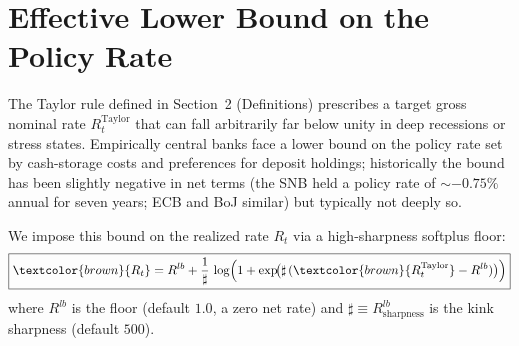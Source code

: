 %
%
%
%

\section{Effective Lower Bound on the Policy Rate}
\label{sec:elb}

The Taylor rule defined in Section~2 (Definitions) prescribes a target
gross nominal rate $R^{\text{Taylor}}_t$ that can fall arbitrarily far
below unity in deep recessions or stress states. Empirically central
banks face a lower bound on the policy rate set by cash-storage costs
and preferences for deposit holdings; historically the bound has been
slightly negative in net terms (the SNB held a policy rate of
${\sim}-0.75\%$ annual for seven years; ECB and BoJ similar) but
typically not deeply so.

We impose this bound on the realized rate $R_t$ via a high-sharpness
softplus floor:
\begin{equation*}
  \boxed{\textcolor{brown}{R_t}
    = R^{lb}
      + \frac{1}{\sharp}\,\log\!\left(
          1 + \exp\!\bigl(\sharp\,(\textcolor{brown}{R^{\text{Taylor}}_t} - R^{lb})\bigr)
        \right)}
\end{equation*}
where $R^{lb}$ is the floor (default $1.0$, a zero net rate) and
$\sharp \equiv R^{lb}_{\text{sharpness}}$ is the kink sharpness
(default $500$).

